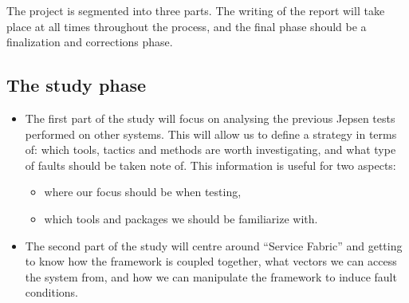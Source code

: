 The project is segmented into three parts. The writing of the report will take place at all times throughout the process, and the final phase should be a finalization and corrections phase.  
\subsection{The study phase  }
\begin{itemize}
\item	The first part of the study will focus on analysing the previous\cite{3} Jepsen tests performed on other systems. This will allow us to define a strategy in terms of: which tools, tactics and methods are worth investigating, and what type of faults should be taken note of. This information is useful for two aspects:  
\begin{itemize}
\item	where our focus should be when testing,  
\item	which tools and packages we should be familiarize with. 
\end{itemize}
\item	 The second part of the study will centre around “Service Fabric” and getting to know how the framework is coupled together, what vectors we can access the system from, and how we can manipulate the framework to induce fault conditions.   
\end{itemize}
